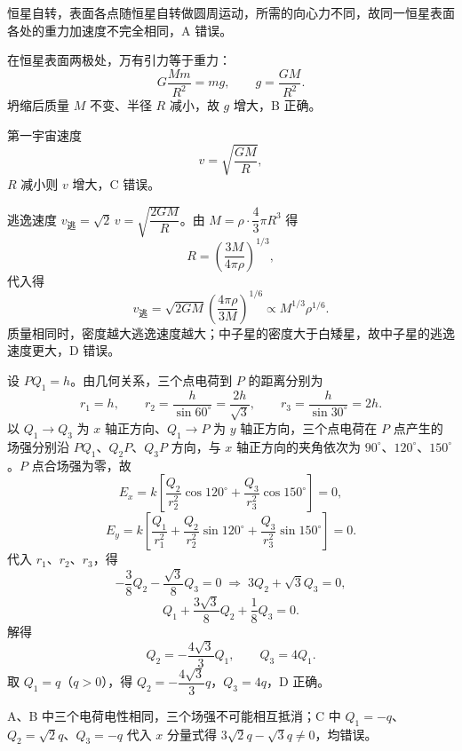 \begin{answer}
恒星自转，表面各点随恒星自转做圆周运动，所需的向心力不同，故同一恒星表面各处的重力加速度不完全相同，A 错误。

在恒星表面两极处，万有引力等于重力：
\[
  G\frac{Mm}{R^{2}}=mg,\qquad g=\frac{GM}{R^{2}}.
\]
坍缩后质量 $M$ 不变、半径 $R$ 减小，故 $g$ 增大，B 正确。

第一宇宙速度
\[
  v=\sqrt{\frac{GM}{R}},
\]
$R$ 减小则 $v$ 增大，C 错误。

逃逸速度 $v_{\text{逃}}=\sqrt{2}\,v=\sqrt{\dfrac{2GM}{R}}$。由 $M=\rho\cdot\dfrac{4}{3}\pi R^{3}$ 得
\[
  R=\left(\frac{3M}{4\pi\rho}\right)^{1/3},
\]
代入得
\[
  v_{\text{逃}}=\sqrt{2GM}\left(\frac{4\pi\rho}{3M}\right)^{1/6}
  \propto M^{1/3}\rho^{1/6}.
\]
质量相同时，密度越大逃逸速度越大；中子星的密度大于白矮星，故中子星的逃逸速度更大，D 错误。
\end{answer}

\begin{answer}
设 $PQ_{1}=h$。由几何关系，三个点电荷到 $P$ 的距离分别为
\[
  r_{1}=h,\qquad r_{2}=\frac{h}{\sin60^{\circ}}=\frac{2h}{\sqrt{3}},\qquad
  r_{3}=\frac{h}{\sin30^{\circ}}=2h.
\]
以 $Q_{1}\to Q_{3}$ 为 $x$ 轴正方向、$Q_{1}\to P$ 为 $y$ 轴正方向，三个点电荷在 $P$ 点产生的场强分别沿 $PQ_{1}$、$Q_{2}P$、$Q_{3}P$ 方向，与 $x$ 轴正方向的夹角依次为 $90^{\circ}$、$120^{\circ}$、$150^{\circ}$。$P$ 点合场强为零，故
\[
  E_{x}=k\left[\frac{Q_{2}}{r_{2}^{2}}\cos120^{\circ}
            +\frac{Q_{3}}{r_{3}^{2}}\cos150^{\circ}\right]=0,
\]
\[
  E_{y}=k\left[\frac{Q_{1}}{r_{1}^{2}}
            +\frac{Q_{2}}{r_{2}^{2}}\sin120^{\circ}
            +\frac{Q_{3}}{r_{3}^{2}}\sin150^{\circ}\right]=0.
\]
代入 $r_{1}$、$r_{2}$、$r_{3}$，得
\[
  -\frac{3}{8}Q_{2}-\frac{\sqrt{3}}{8}Q_{3}=0
  \;\Longrightarrow\;
  3Q_{2}+\sqrt{3}Q_{3}=0,
\]
\[
  Q_{1}+\frac{3\sqrt{3}}{8}Q_{2}+\frac{1}{8}Q_{3}=0.
\]
解得
\[
  Q_{2}=-\frac{4\sqrt{3}}{3}Q_{1},\qquad Q_{3}=4Q_{1}.
\]
取 $Q_{1}=q$（$q>0$），得 $Q_{2}=-\dfrac{4\sqrt{3}}{3}q$，$Q_{3}=4q$，D 正确。

A、B 中三个电荷电性相同，三个场强不可能相互抵消；C 中 $Q_{1}=-q$、$Q_{2}=\sqrt{2}q$、$Q_{3}=-q$ 代入 $x$ 分量式得 $3\sqrt{2}q-\sqrt{3}q\ne0$，均错误。
\end{answer}

